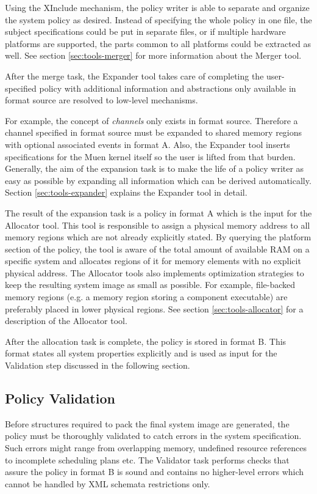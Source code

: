\documentclass[a4paper,twoside,titlepage]{article}
\begin{document}
Using the XInclude mechanism, the policy writer is able to separate and organize
the system policy as desired. Instead of specifying the whole policy in one
file, the subject specifications could be put in separate files, or if multiple
hardware platforms are supported, the parts common to all platforms could be
extracted as well. See section \ref{sec:tools-merger} for more information about
the Merger tool.

After the merge task, the Expander tool takes care of completing the
user-specified policy with additional information and abstractions only
available in format source are resolved to low-level mechanisms.

For example, the concept of \emph{channels} only exists in format source.
Therefore a channel specified in format source must be expanded to shared memory
regions with optional associated events in format A.  Also, the Expander tool
inserts specifications for the Muen kernel itself so the user is lifted from
that burden. Generally, the aim of the expansion task is to make the life of a
policy writer as easy as possible by expanding all information which can be
derived automatically. Section \ref{sec:tools-expander} explains the Expander
tool in detail.

The result of the expansion task is a policy in format A which is the input for
the Allocator tool. This tool is responsible to assign a physical memory address
to all memory regions which are not already explicitly stated. By querying the
platform section of the policy, the tool is aware of the total amount of
available RAM on a specific system and allocates regions of it for memory
elements with no explicit physical address.  The Allocator tools also implements
optimization strategies to keep the resulting system image as small as possible.
For example, file-backed memory regions (e.g. a memory region storing a
component executable) are preferably placed in lower physical regions. See
section \ref{sec:tools-allocator} for a description of the Allocator tool.

After the allocation task is complete, the policy is stored in format B. This
format states all system properties explicitly and is used as input for the
Validation step discussed in the following section.

\subsection{Policy Validation}
Before structures required to pack the final system image are generated, the
policy must be thoroughly validated to catch errors in the system specification.
Such errors might range from overlapping memory, undefined resource references
to incomplete scheduling plans etc. The Validator task performs checks that
assure the policy in format B is sound and contains no higher-level errors which
cannot be handled by XML schemata restrictions only.
\end{document}

